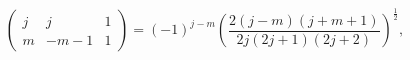 \[\begin{pmatrix}j&j&1\\
m&-m-1&1\end{pmatrix}=(-1)^{j-m}\left(\frac{2(j-m)(j+m+1)}{2j(2j+1)(2j+2)}%
\right)^{\frac{1}{2}},\]